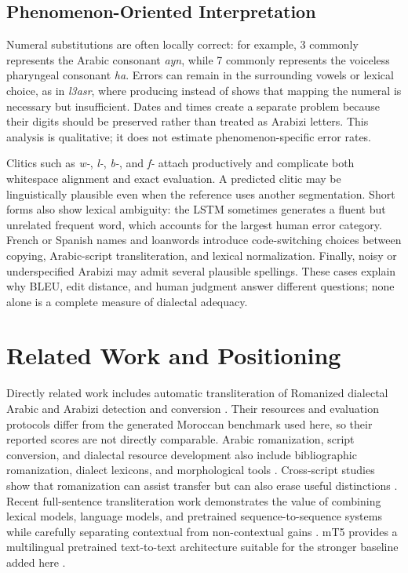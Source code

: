 \documentclass[runningheads]{llncs}
\newcommand{\textarabic}[1]{\textRL{\foreignlanguage{arabic}{#1}}}
\begin{document}
\subsection{Phenomenon-Oriented Interpretation}

Numeral substitutions are often locally correct: for example, 3 commonly represents the Arabic consonant \textit{ayn}, while 7 commonly represents the voiceless pharyngeal consonant \textit{ha}. Errors can remain in the surrounding vowels or lexical choice, as in \textit{l3asr}, where producing \textarabic{العاصر} instead of \textarabic{العصر} shows that mapping the numeral is necessary but insufficient. Dates and times create a separate problem because their digits should be preserved rather than treated as Arabizi letters. This analysis is qualitative; it does not estimate phenomenon-specific error rates.

Clitics such as \textit{w-}, \textit{l-}, \textit{b-}, and \textit{f-} attach productively and complicate both whitespace alignment and exact evaluation. A predicted clitic may be linguistically plausible even when the reference uses another segmentation. Short forms also show lexical ambiguity: the LSTM sometimes generates a fluent but unrelated frequent word, which accounts for the largest human error category. French or Spanish names and loanwords introduce code-switching choices between copying, Arabic-script transliteration, and lexical normalization. Finally, noisy or underspecified Arabizi may admit several plausible spellings. These cases explain why BLEU, edit distance, and human judgment answer different questions; none alone is a complete measure of dialectal adequacy.

\section{Related Work and Positioning}

Directly related work includes automatic transliteration of Romanized dialectal Arabic and Arabizi detection and conversion \citep{al-badrashiny-etal-2014-automatic,darwish-2014-arabizi}. Their resources and evaluation protocols differ from the generated Moroccan benchmark used here, so their reported scores are not directly comparable. Arabic romanization, script conversion, and dialectal resource development also include bibliographic romanization, dialect lexicons, and morphological tools \citep{eryani-habash-2021-automatic,diab-etal-2014-tharwa,pasha-etal-2014-madamira}. Cross-script studies show that romanization can assist transfer but can also erase useful distinctions \citep{amrhein-sennrich-2020-romanization,purkayastha-etal-2023-romanization}. Recent full-sentence transliteration work demonstrates the value of combining lexical models, language models, and pretrained sequence-to-sequence systems while carefully separating contextual from non-contextual gains \citep{kirov-etal-2024-context}. mT5 provides a multilingual pretrained text-to-text architecture suitable for the stronger baseline added here \citep{xue-etal-2021-mt5}.
\end{document}
